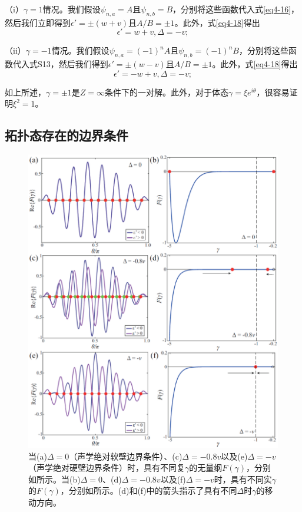 （i）\(\gamma = 1\)情况。我们假设\(\psi_{n,a}=A\)且\(\psi_{n,b}=B\)，分别将这些函数代入式\ref{eq4-16}，然后我们立即得到\(\epsilon'=\pm(w + v)\)且\(A/B=\pm1\)。此外，式\ref{eq4-18}得出
\begin{equation}\label{eq4-31}
    \epsilon' = w + v, \Delta = -v;
\end{equation}

（ii）\(\gamma = -1\)情况。我们假设\(\psi_{n,a}=(-1)^{n}A\)且\(\psi_{n,b}=(-1)^{n}B\)，分别将这些函数代入式S13，然后我们得到\(\epsilon'=\pm(w - v)\)且\(A/B=\pm1\)。此外，式\ref{eq4-18}得出
\begin{equation}\label{eq4-32}
    \epsilon' = -w + v, \Delta = -v;
\end{equation}

如上所述，\(\gamma=\pm1\)是\(Z=\infty\)条件下的一对解。此外，对于体态\(\gamma=\xi e^{i\theta}\)，很容易证明\(\xi^{2}=1\)。

\subsection{拓扑态存在的边界条件}

\begin{figure}[h!]
    \centering
    \includegraphics[width=1\textwidth]{images/fig4-4.eps} 
    \caption{当(a)$\Delta = 0$（声学绝对软壁边界条件）、(c)$\Delta = -0.8v$以及(e)$\Delta = -v$（声学绝对硬壁边界条件）时，具有不同复$\gamma$的无量纲$F(\gamma)$，分别如所示。当(b)$\Delta = 0$、(d)$\Delta = -0.8v$以及(f)$\Delta = -v$时，具有不同实$\gamma$的$F(\gamma)$，分别如所示。(d)和(f)中的箭头指示了具有不同$\Delta$时$\gamma$的移动方向。}
    \label{fig_4_4}
\end{figure} 

